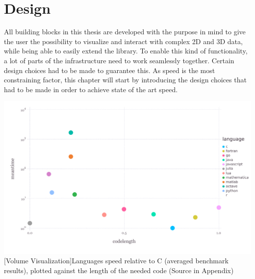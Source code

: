 \section{Design}

All building blocks in this thesis are developed with the purpose in mind to give the user the possibility to visualize and interact with complex 2D and 3D data, while being able to easily extend the library.
To enable this kind of functionality, a lot of parts of the infrastructure need to work seamlessly together.
Certain design choices had to be made to guarantee this. As speed is the most constraining factor, this chapter will start by introducing the design choices that had to be made in order to achieve state of the art speed.

\vspace{1em}
\begin{minipage}{\linewidth}
    \centering
    \includegraphics[width=0.9\linewidth]{graphics/julia_bench.pdf}
    [Volume Visualization]{Languages speed relative to C (averaged benchmark results), plotted against the length of the needed code (Source in Appendix)}
    \label{fig:juliabench}
\end{minipage}

